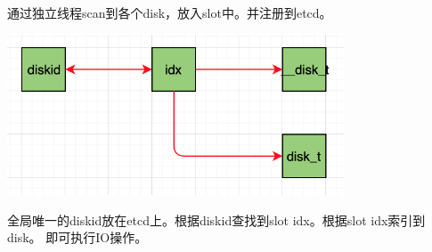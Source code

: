 通过独立线程scan到各个disk，放入slot中。并注册到etcd。

\begin{center}
\includegraphics[width=10cm]{../imgs/diskid-slot.png}
\end{center}

全局唯一的diskid放在etcd上。根据diskid查找到slot idx。根据slot idx索引到disk。
即可执行IO操作。
